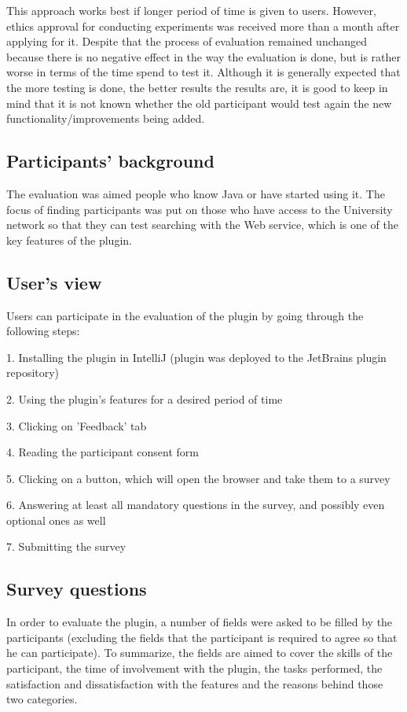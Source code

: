 \documentclass{l4proj}
\begin{document}
This approach works best if longer period of time is given to users. However, ethics approval for conducting experiments was received more than a month after applying for it. Despite that the process of evaluation remained unchanged because there is no negative effect in the way the evaluation is done, but is rather worse in terms of the time spend to test it. Although it is generally expected that the more testing is done, the better results the results are, it is good to keep in mind that it is not known whether the old participant would test again the new functionality/improvements being added.

\subsection{Participants' background}
The evaluation was aimed people who know Java or have started using it. The focus of finding participants was put on those who have access to the University network so that they can test searching with the Web service, which is one of the key features of the plugin. 

\subsection{User's view}
Users can participate in the evaluation of the plugin by going through the following steps:

1. Installing the plugin in IntelliJ (plugin was deployed to the JetBrains plugin repository)

2. Using the plugin's features for a desired period of time

3. Clicking on 'Feedback' tab

4. Reading the participant consent form

5. Clicking on a button, which will open the browser and take them to a survey

6. Answering at least all mandatory questions in the survey, and possibly even optional ones as well

7. Submitting the survey

\subsection{Survey questions}
In order to evaluate the plugin, a number of fields were asked to be filled by the participants (excluding the fields that the participant is required to agree so that he can participate). To summarize, the fields are aimed to cover the skills of the participant, the time of involvement with the plugin, the tasks performed, the satisfaction and dissatisfaction with the features and the reasons behind those two categories.
\end{document}
